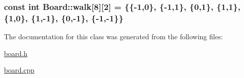 \subsubsection[{\texorpdfstring{walk}{walk}}]{\setlength{\rightskip}{0pt plus 5cm}const int Board\+::walk\mbox{[}8\mbox{]}\mbox{[}2\mbox{]} = \{\{-\/1,0\}, \{-\/1,1\}, \{0,1\}, \{1,1\}, \{1,0\}, \{1,-\/1\}, \{0,-\/1\}, \{-\/1,-\/1\}\}\hspace{0.3cm}{\ttfamily [private]}}\hypertarget{classBoard_a362b986e66494ee079a6dd2b8b08075f}{}\label{classBoard_a362b986e66494ee079a6dd2b8b08075f}


The documentation for this class was generated from the following files\+:\begin{DoxyCompactItemize}
\item 
\hyperlink{board_8h}{board.\+h}\item 
\hyperlink{board_8cpp}{board.\+cpp}\end{DoxyCompactItemize}
